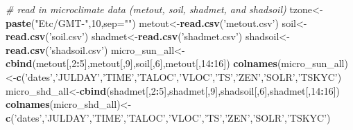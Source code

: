 \documentclass[]{article}
\newenvironment{Shaded}{\begin{snugshade}}{\end{snugshade}}
\newcommand{\KeywordTok}[1]{\textcolor[rgb]{0.13,0.29,0.53}{\textbf{#1}}}
\newcommand{\DataTypeTok}[1]{\textcolor[rgb]{0.13,0.29,0.53}{#1}}
\newcommand{\DecValTok}[1]{\textcolor[rgb]{0.00,0.00,0.81}{#1}}
\newcommand{\StringTok}[1]{\textcolor[rgb]{0.31,0.60,0.02}{#1}}
\newcommand{\CommentTok}[1]{\textcolor[rgb]{0.56,0.35,0.01}{\textit{#1}}}
\newcommand{\OperatorTok}[1]{\textcolor[rgb]{0.81,0.36,0.00}{\textbf{#1}}}
\newcommand{\NormalTok}[1]{#1}
\begin{document}
\begin{Shaded}
\begin{Highlighting}[]
\CommentTok{# read in microclimate data (metout, soil, shadmet, and shadsoil)}
\NormalTok{tzone<-}\KeywordTok{paste}\NormalTok{(}\StringTok{"Etc/GMT-"}\NormalTok{,}\DecValTok{10}\NormalTok{,}\DataTypeTok{sep=}\StringTok{""}\NormalTok{)}
\NormalTok{metout<-}\KeywordTok{read.csv}\NormalTok{(}\StringTok{'metout.csv'}\NormalTok{)}
\NormalTok{soil<-}\KeywordTok{read.csv}\NormalTok{(}\StringTok{'soil.csv'}\NormalTok{)}
\NormalTok{shadmet<-}\KeywordTok{read.csv}\NormalTok{(}\StringTok{'shadmet.csv'}\NormalTok{)}
\NormalTok{shadsoil<-}\KeywordTok{read.csv}\NormalTok{(}\StringTok{'shadsoil.csv'}\NormalTok{)}
\NormalTok{micro_sun_all<-}\KeywordTok{cbind}\NormalTok{(metout[,}\DecValTok{2}\OperatorTok{:}\DecValTok{5}\NormalTok{],metout[,}\DecValTok{9}\NormalTok{],soil[,}\DecValTok{6}\NormalTok{],metout[,}\DecValTok{14}\OperatorTok{:}\DecValTok{16}\NormalTok{])}
\KeywordTok{colnames}\NormalTok{(micro_sun_all)<-}\KeywordTok{c}\NormalTok{(}\StringTok{'dates'}\NormalTok{,}\StringTok{'JULDAY'}\NormalTok{,}\StringTok{'TIME'}\NormalTok{,}\StringTok{'TALOC'}\NormalTok{,}\StringTok{'VLOC'}\NormalTok{,}\StringTok{'TS'}\NormalTok{,}\StringTok{'ZEN'}\NormalTok{,}\StringTok{'SOLR'}\NormalTok{,}\StringTok{'TSKYC'}\NormalTok{)}
\NormalTok{micro_shd_all<-}\KeywordTok{cbind}\NormalTok{(shadmet[,}\DecValTok{2}\OperatorTok{:}\DecValTok{5}\NormalTok{],shadmet[,}\DecValTok{9}\NormalTok{],shadsoil[,}\DecValTok{6}\NormalTok{],shadmet[,}\DecValTok{14}\OperatorTok{:}\DecValTok{16}\NormalTok{])}
\KeywordTok{colnames}\NormalTok{(micro_shd_all)<-}\KeywordTok{c}\NormalTok{(}\StringTok{'dates'}\NormalTok{,}\StringTok{'JULDAY'}\NormalTok{,}\StringTok{'TIME'}\NormalTok{,}\StringTok{'TALOC'}\NormalTok{,}\StringTok{'VLOC'}\NormalTok{,}\StringTok{'TS'}\NormalTok{,}\StringTok{'ZEN'}\NormalTok{,}\StringTok{'SOLR'}\NormalTok{,}\StringTok{'TSKYC'}\NormalTok{)}


\end{Highlighting}
\end{Shaded}
\end{document}
